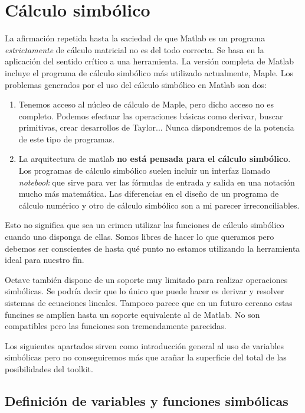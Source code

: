 \section{Cálculo simbólico}

La afirmación repetida hasta la saciedad de que Matlab es un programa
\emph{estrictamente} de cálculo matricial no es del todo correcta.
Se basa en la aplicación del sentido crítico a una herramienta. La
versión completa de Matlab incluye el programa de cálculo simbólico
más utilizado actualmente, Maple. Los problemas generados por el uso
del cálculo simbólico en Matlab son dos:

\begin{enumerate}
\item Tenemos acceso al núcleo de cálculo de Maple, pero dicho acceso no
es completo. Podemos efectuar las operaciones básicas como derivar,
buscar primitivas, crear desarrollos de Taylor... Nunca dispondremos
de la potencia de este tipo de programas.
\item La arquitectura de matlab \textbf{no está pensada para el cálculo
simbólico}. Los programas de cálculo simbólico suelen incluir un interfaz
llamado \emph{notebook} que sirve para ver las fórmulas de entrada
y salida en una notación mucho más matemática. Las diferencias en
el diseño de un programa de cálculo numérico y otro de cálculo simbólico
son a mi parecer irreconciliables.
\end{enumerate}
Esto no significa que sea un crimen utilizar las funciones de cálculo
simbólico cuando uno disponga de ellas. Somos libres de hacer lo que
queramos pero debemos ser conscientes de hasta qué punto no estamos
utilizando la herramienta ideal para nuestro fín.

Octave también dispone de un soporte muy limitado para realizar operaciones
simbólicas. Se podría decir que lo único que puede hacer es derivar
y resolver sistemas de ecuaciones lineales. Tampoco parece que en
un futuro cercano estas funcines se amplíen hasta un soporte equivalente
al de Matlab. No son compatibles pero las funciones son tremendamente
parecidas.

Los siguientes apartados sirven como introducción general al uso de
variables simbólicas pero no conseguiremos más que arañar la superficie
del total de las posibilidades del toolkit.


\subsection{Definición de variables y funciones simbólicas}

